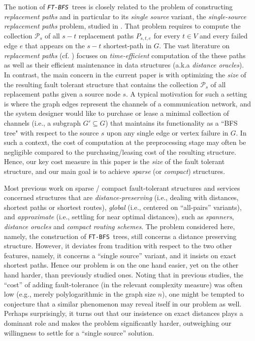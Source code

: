 \documentclass[12pt]{article}
\def\FTBFS{\mbox{\tt FT-BFS}}
\begin{document}
The notion of {\em \FTBFS}\ trees is closely related to the problem of
constructing \emph{replacement paths} and in particular to its
{\em single source} variant,
the \emph{single-source replacement paths} problem,
studied in \cite{GW12}. That problem requires to compute the collection
$\mathcal{P}_{s}$ of all $s-t$ replacement paths $P_{s,t,e}$ for every $t \in V$
and every failed edge $e$ that appears on the $s-t$ shortest-path in $G$.
The vast literature on \emph{replacement paths} (cf. \cite{BK09,GW12,RTREP05,TZ05,WY10}) focuses on \emph{time-efficient} computation of the these paths as well as their efficient maintenance in data structures (a.k.a {\em distance oracles}).
In contrast, the main concern in the current paper is with optimizing
the \emph{size} of the resulting fault tolerant structure that contains the
collection $\mathcal{P}_{s}$ of all replacement paths given a source node $s$.
A typical motivation for such a setting is where the graph edges represent
the channels of a communication network, and the system designer would like
to purchase or lease a minimal collection of channels
(i.e., a subgraph $G' \subseteq G$) that maintains its functionality
as a ``BFS tree" with respect to the source $s$ upon any single
edge or vertex failure in $G$.
In such a context, the cost of computation at the preprocessing stage may
often be negligible compared to the purchasing/leasing cost of the resulting
structure. Hence, our key cost measure in this paper is the \emph{size} of
the fault tolerant structure, and our main goal is to achieve {\em sparse}
(or {\em compact}) structures.

Most previous work on sparse / compact fault-tolerant structures and services
concerned structures that are {\em distance-preserving}
(i.e., dealing with distances, shortest paths or shortest routes),
{\em global} (i.e., centered on ``all-pairs'' variants),
and {\em approximate} (i.e., settling for near optimal distances),
such as {\em spanners}, {\em distance oracles} and
{\em compact routing schemes}.
The problem considered here, namely, the construction of \FTBFS\ trees,
still concerns a distance preserving structure.
However, it deviates from tradition with respect to the two other features,
namely, it concerns a ``single source'' variant,
and it insists on exact shortest paths.
Hence our problem is on the one hand easier, yet on the other hand harder,
than previously studied ones.
Noting that in previous studies, the ``cost'' of adding fault-tolerance
(in the relevant complexity measure) was often low (e.g., merely polylogarithmic
in the graph size $n$),
one might be tempted to conjecture that a similar phenomenon may reveal itself
in our problem as well.
Perhaps surprisingly, it turns out that our insistence on exact distances
plays a dominant role and makes the problem significantly harder,
outweighing our willingness to settle for a ``single source'' solution.
\end{document}
